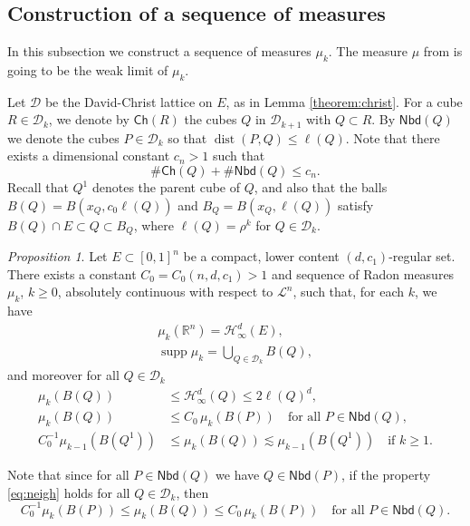 \documentclass[11pt,reqno]{amsart}
\def\dist{\mathop\mathrm{dist}} 						%
\theoremstyle{definition}
\theoremstyle{remark}
\numberwithin{equation}{section}
\newcommand{\R}{\mathbb{R}}
\newcommand{\hdc}{\mathcal{H}^d_\infty}
\newcommand{\dD}{\mathcal{D}}
\newcommand{\DD}{\mathcal{D}}
\DeclareMathOperator{\supp}{supp}
\newcommand{\Child}{\mathsf{Ch}}
\newcommand{\Nei}{\mathsf{Nbd}}
\newcommand{\dL}{\mathcal{L}}
\theoremstyle{theorem}
\newtheorem{propo}[theorem]{Proposition}
\theoremstyle{definition}
\theoremstyle{remark}
\numberwithin{equation}{section}
\begin{document}
\subsection{Construction of a sequence of measures}
In this subsection we construct a sequence of measures $\mu_k$. The measure $\mu$ from  is going to be the weak limit of $\mu_k$.

Let $\DD$ be the David-Christ lattice on $E$, as in Lemma \ref{theorem:christ}.
For a cube $R \in \dD_k$, we denote by $\Child(R)$ the cubes $Q$ in $\dD_{k+1}$ with $Q \subset R$. By $\Nei(Q)$ we denote the cubes $P \in \dD_k$ so that $\dist(P,Q) \leq \ell(Q)$. Note that there exists a dimensional constant $c_n>1$ such that
\begin{equation}\label{eq:childneicard}
\#\Child(Q)+\#\Nei(Q)\le c_n.
\end{equation}
Recall that $Q^1$ denotes the parent cube of $Q$, and also that the balls $B(Q) = B(x_Q, c_0 \ell(Q))$ and $B_Q= B(x_Q, \ell(Q))$ satisfy $B(Q) \cap E \subset Q \subset B_Q$, where $\ell(Q)=\rho^k$ for $Q\in\DD_k$.

\begin{propo}\label{propo-frostman}
	Let $E \subset [0,1]^n$ be a compact, lower content $(d,c_1)$-regular set. There exists a constant $C_0=C_0(n,d,c_1)>1$ and sequence of Radon measures $\mu_k$, $k \ge 0$, absolutely continuous with respect to $\dL^n$, such that, for each $k$, we have
	\begin{gather}
		\mu_k(\R^n) = \hdc(E) \label{e:D},\\
		\supp\mu_k=\bigcup_{Q\in\DD_k}B(Q)\label{eq:supp},
	\end{gather}
	and moreover for all $Q\in\DD_k$
	\begin{align}
		\mu_k(B(Q))&\le \hdc(Q)\le 2\ell(Q)^d,\label{eq:poly}\\
		\mu_k(B(Q))&\le C_0\,\mu_k(B(P))\quad\text{for all $P\in\Nei(Q)$},\label{eq:neigh}\\
		C_0^{-1}\mu_{k-1}(B(Q^1))&\le \mu_k(B(Q))\lesssim \mu_{k-1}(B(Q^1)) \quad\text{if $k\ge 1$}.\label{eq:child}
	\end{align}
\end{propo}

Note that since for all $P\in\Nei(Q)$ we have $Q\in\Nei(P)$, if the property \eqref{eq:neigh} holds for all $Q\in\DD_k$, then
\begin{equation}\label{eq:doubl}
	C_0^{-1}\mu_k(B(P))\le \mu_k(B(Q))\le C_0\,\mu_k(B(P))\quad\text{for all $P\in\Nei(Q)$}.
\end{equation}
\end{document}
